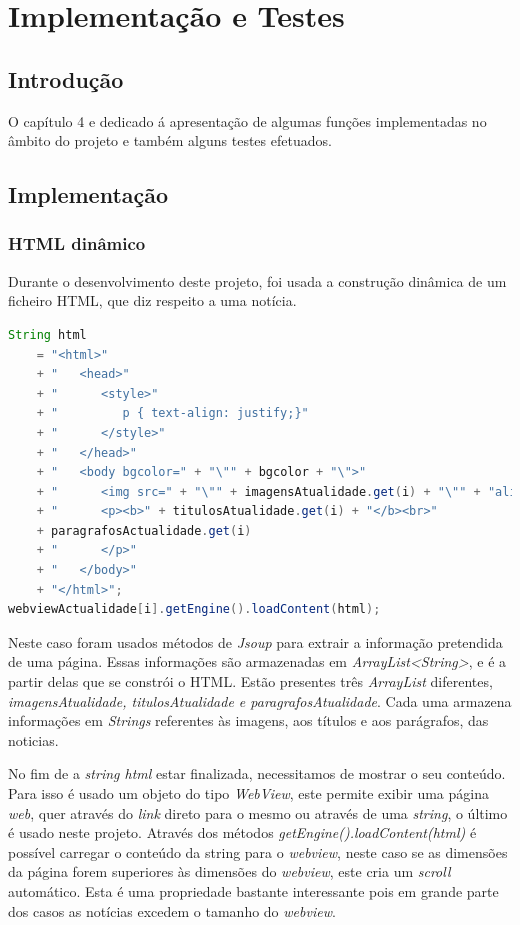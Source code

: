 \chapter{Implementação e Testes}
\label{chap:imp-test}

\section{Introdução}
\label{chap4:sec:intro}
O capítulo 4 e dedicado á apresentação de algumas funções implementadas no âmbito do projeto e também alguns testes efetuados.

\section{Implementação}
\label{chap4:sec:...}

\subsection{HTML dinâmico}
Durante o desenvolvimento deste projeto, foi usada a construção dinâmica de um ficheiro \ac{HTML}, que diz respeito a uma notícia. 

\begin{lstlisting}[language=Java, caption = Exemplo de construção de \ac{HTML} dinâmico \label{code:html_dinamico}]
String html
    = "<html>"
    + "   <head>"
    + "      <style>"
    + "         p { text-align: justify;}"
    + "      </style>"
    + "   </head>"
    + "   <body bgcolor=" + "\"" + bgcolor + "\">"
    + "      <img src=" + "\"" + imagensAtualidade.get(i) + "\"" + "align=" + img_align + " width=\"150\" height=\"130\" />"
    + "      <p><b>" + titulosAtualidade.get(i) + "</b><br>"
    + paragrafosActualidade.get(i)
    + "      </p>"
    + "   </body>"
    + "</html>";
webviewActualidade[i].getEngine().loadContent(html);    

\end{lstlisting}
Neste caso foram usados métodos de \emph{Jsoup} para extrair a informação pretendida de uma página. Essas informações são armazenadas em \emph{ArrayList<String>}, e é a partir delas que se constrói o \ac{HTML}. Estão presentes três \emph{ArrayList} diferentes, \emph{imagensAtualidade, titulosAtualidade e paragrafosAtualidade}. Cada uma armazena informações em \emph{Strings} referentes às imagens, aos títulos e aos parágrafos, das noticias. \par
No fim de a \emph{string html} estar finalizada, necessitamos de mostrar o seu conteúdo. Para isso é usado um objeto do tipo \emph{WebView}, este permite exibir uma página \emph{web}, quer através do \emph{link} direto para o mesmo ou através de uma \emph{string}, o último é usado neste projeto.
Através dos métodos \emph{getEngine().loadContent(html)} é possível carregar o conteúdo da string para o \emph{webview}, neste caso se as dimensões da página forem superiores às dimensões do \emph{webview}, este cria um \emph{scroll} automático. Esta é uma propriedade bastante interessante pois em grande parte dos casos as notícias excedem o tamanho do \emph{webview}.


